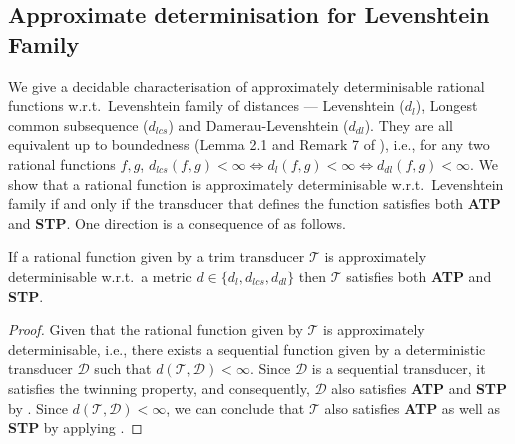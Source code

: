 \documentclass[a4paper,UKenglish,cleveref, autoref, thm-restate,authorcolumns, colorlinks]{lipics-v2021}
\newcommand\calD{\mathcal{D}}
\newcommand\calT{\mathcal{T}}
\newcommand{\dlev}{\ensuremath{d_l}}
\newcommand{\ATP}[0]{\textbf{ATP}}
\newcommand{\STP}[0]{\textbf{STP}}
\begin{document}
\subsection{Approximate determinisation for Levenshtein Family}\label{subsec:lev}
We give a decidable characterisation of approximately determinisable rational functions w.r.t.~Levenshtein family of distances --- Levenshtein ($\dlev$), Longest common subsequence ($d_{lcs}$) and Damerau-Levenshtein ($d_{dl}$). They are all equivalent up to boundedness (Lemma 2.1 and Remark 7 of \cite{editdistance}), i.e., for any two rational functions $f,g$, $d_{lcs}(f,g) < \infty \iff \dlev(f,g) < \infty \iff d_{dl}(f,g) < \infty.$ We show that a rational function is approximately determinisable w.r.t.~Levenshtein family if and only if the transducer that defines the function satisfies both \ATP{} and \STP{}. One direction is a consequence of  as follows.

\begin{proposition}\label{proposition:approxtoATPSTP}
   If a rational function given by a trim transducer $\calT$ is approximately determinisable w.r.t.~a metric $d \in \{d_l,d_{lcs},d_{dl}\}$ then $\calT$ satisfies both \ATP{} and \STP{}.
\end{proposition}
\begin{proof}
    Given that the rational function given by $\calT$ is approximately determinisable, i.e., there exists a sequential function given by a deterministic transducer $\calD$ such that $d(\calT,\calD) < \infty$. Since $\calD$ is a sequential transducer, it satisfies the twinning property, and consequently, $\calD$ also satisfies \ATP{} and \STP{} by . Since $d(\calT,\calD) <\infty$, we can conclude that $\calT$ also satisfies \ATP{} as well as \STP{} by applying .
\end{proof}
\end{document}
